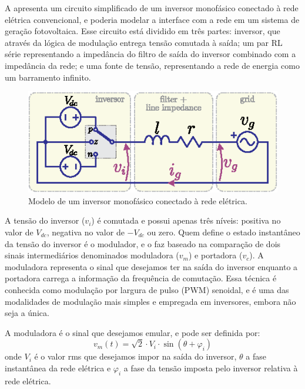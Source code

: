 A  apresenta um circuito simplificado de um inversor monofásico conectado à rede elétrica
convencional, e poderia modelar a interface com a rede em um sistema de geração fotovoltaica.
Esse circuito está dividido em três partes: inversor, que através da lógica de modulação entrega tensão comutada à
saída; um par RL série representando a impedância do filtro de saída
do inversor combinado com a impedância da rede; e uma fonte de tensão, representando a rede de energia como um
barramento infinito.
\begin{figure}[htbp]
    \centering
    \includegraphics{figs/inv.eps}
    \caption{Modelo de um inversor monofásico conectado à rede elétrica.}
    \label{fig:inv}
\end{figure}


A tensão do inversor ($v_i$) é comutada e possui apenas três níveis: positiva no valor de $V_{dc}$, negativa no valor
de $-V_{dc}$ ou zero.
Quem define o estado instantâneo da tensão do inversor é o modulador, e o faz baseado na comparação de dois sinais
intermediários denominados moduladora ($v_m$) e portadora ($v_c$).
A moduladora representa o sinal que desejamos ter na saída do inversor enquanto a portadora carrega a
informação da frequência de comutação.
Essa técnica é conhecida como modulação por largura de pulso (PWM) senoidal, e é uma das modalidades de modulação mais
simples e empregada em inversores, embora não seja a única.

A moduladora é o sinal que desejamos emular, e pode ser definida por:
\begin{equation}
    v_m(t) = \sqrt{2} \cdot V_i \cdot \sin(\theta + \varphi_i)
\end{equation}
onde $V_i$ é o valor rms que desejamos impor na saída do inversor, $\theta$ a fase instantânea da rede elétrica e
$\varphi_i$ a fase da tensão imposta pelo inversor relativa à rede elétrica.

